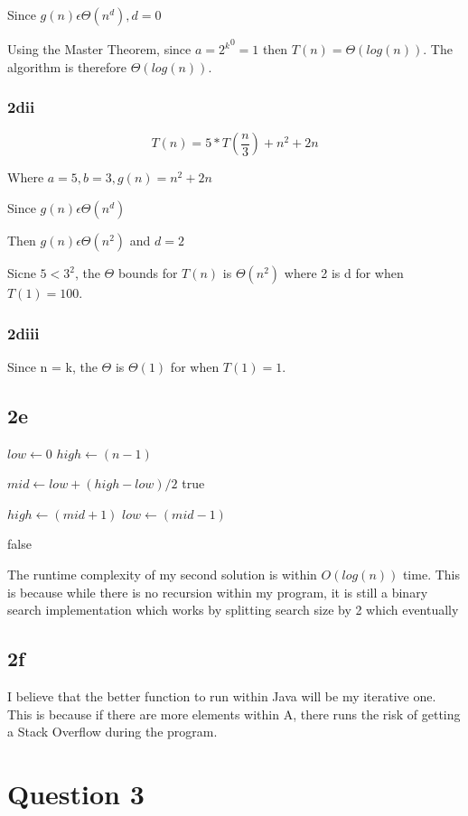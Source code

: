 \documentclass[oneside, a4paper]{article}
\begin{document}
Since $g(n) \epsilon \Theta(n^d), d = 0$

Using the Master Theorem, since $a = {2^k}^0 = 1$ then $T(n) = \Theta(log(n))$. The algorithm is therefore $\Theta(log(n))$. 

\subsubsection*{2dii}
\begin{center}
    $$T(n) = 5 * T (\frac{n}{3}) + n^2 + 2n$$

    Where $a = 5, b = 3, g(n) = n^2 + 2n$

    Since $g(n) \epsilon \Theta(n^d)$ 

    Then $g(n) \epsilon \Theta(n^2)$ and $d = 2$

    Sicne $5 < 3^2$, the $\Theta$ bounds for $T(n)$ is $\Theta(n^2)$ where 2 is d for when $T(1) = 100$.
\end{center}


\subsubsection*{2diii}
Since n = k, the $\Theta$ is  $\Theta(1)$ for when $T(1) = 1$.

\subsection*{2e}
\begin{algorithmic}
        \State $low \gets 0$
        \State $high \gets (n - 1)$


            \State $mid \gets low + (high - low) / 2$
                \State \Return true    
            \EndIf
                
                \State $high \gets (mid + 1)$
            \Else
                \State $low \gets (mid - 1)$
            \EndIf

        \EndWhile
        \State \Return false    
        
    \EndFunction
\end{algorithmic}

The runtime complexity of my second solution is within $O(log(n))$ time. This is because while there is no recursion within my program, it is still a binary search implementation which works by splitting search size by 2 which eventually 

\subsection*{2f}
I believe that the better function to run within Java will be my iterative one. This is because if there are more elements within A, there runs the risk of getting a Stack Overflow during the program. 


\section*{Question 3}
\end{document}
